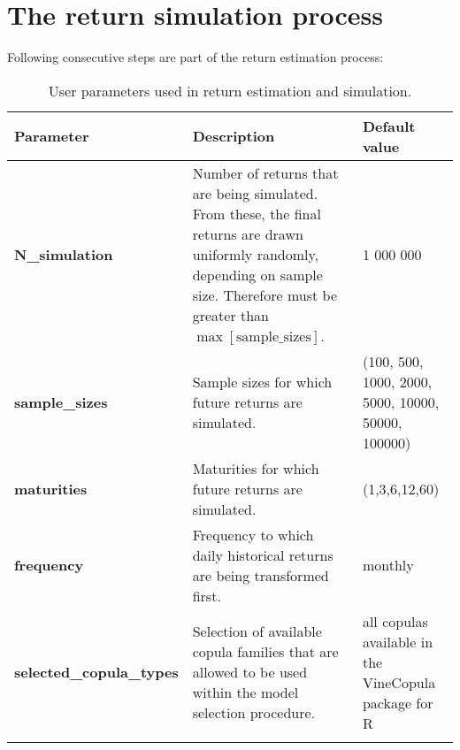 \section{The return simulation process}

Following consecutive steps are part of the return estimation process:

\begin{table}[h]
	\centering
	\begin{tabularx}{0.9\linewidth}{lXX}
		Parameter & Description & Default value\\
		\toprule
		\textbf{N\_simulation} & Number of returns that are being simulated. From these, the final returns are drawn uniformly randomly, depending on sample size. Therefore must be greater than $\max\left[\text{sample\_sizes}\right]$. & 1 000 000
		\\
		\textbf{sample\_sizes} & Sample sizes for which future returns are simulated. & (100, 500, 1000, 2000, 5000, 10000, 50000, 100000) 
		\\
		\textbf{maturities} & Maturities for which future returns are simulated.& (1,3,6,12,60) 
		\\
		\textbf{frequency} & Frequency to which daily historical returns are being transformed first. & monthly
		\\
		\textbf{selected\_copula\_types} & Selection of available copula families that are allowed to be used within the model selection procedure. & all copulas available in the VineCopula package for R
		\\
		\bottomrule& 
	\end{tabularx}
	\caption{User parameters used in return estimation and simulation.}
	\label{tab:return_estimation:user_parameters}
\end{table} 
